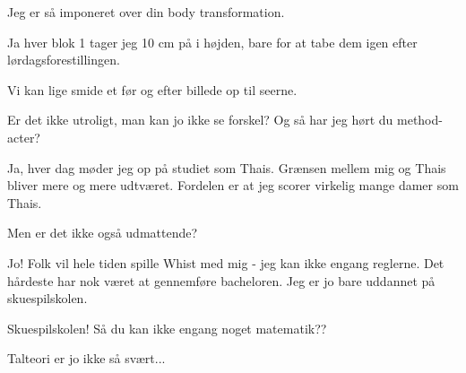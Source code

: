 \documentclass[a4paper,11pt]{article}
\begin{document}
\begin{sketch}
 Jeg er så imponeret over din body transformation.

 Ja hver blok 1 tager jeg 10 cm på i højden, bare for at tabe dem igen efter lørdagsforestillingen.

 Vi kan lige smide et før og efter billede op til seerne.


 Er det ikke utroligt, man kan jo ikke se forskel? Og så har jeg hørt du method-acter?

 Ja, hver dag møder jeg op på studiet som Thais. 
Grænsen mellem mig og Thais bliver mere og mere udtværet. Fordelen er at jeg scorer virkelig mange damer som Thais.

 Men er det ikke også udmattende?

 Jo! Folk vil hele tiden spille Whist med mig - jeg kan ikke engang reglerne. Det hårdeste har nok været at gennemføre bacheloren. Jeg er jo bare uddannet på skuespilskolen.

 Skuespilskolen! Så du kan ikke engang noget matematik??

 Talteori er jo ikke så svært...
\end{sketch}
\end{document}
